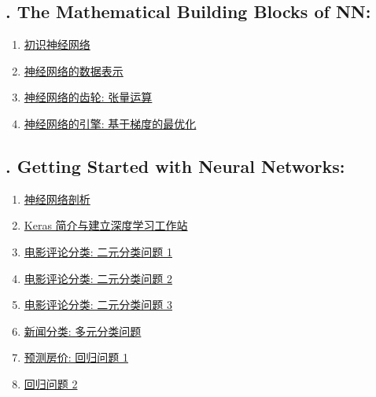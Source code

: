 \documentclass[11pt]{article}
\begin{document}
\subsection*{\small {}. The Mathematical Building Blocks of NN:}

\vspace{-0.5cm}

\begin{multicols}{2}
	\begin{enumerate}
		\item \href{https://mp.weixin.qq.com/s/ZKk_gu__FrkzHovbhUdDwQ}{初识神经网络}	%
		\item \href{https://mp.weixin.qq.com/s/u6eTUeILRhIsIuPVAVegsw}{神经网络的数据表示}	%
		\item \href{https://mp.weixin.qq.com/s/HOeED8Um1nz99EEnJ7I_JQ}{神经网络的齿轮: 张量运算}	%
		\item \href{https://mp.weixin.qq.com/s/9VCT-gYZ4rLtzUIWouqqGA}{神经网络的引擎: 基于梯度的最优化}	%
	\end{enumerate}
\end{multicols}

\subsection*{\small {}. Getting Started with Neural Networks:}

\vspace{-0.5cm}

\begin{multicols}{2}
	\begin{enumerate}
		\item \href{https://mp.weixin.qq.com/s/WlVnJmoQKPPKhLF7weLcrQ}{神经网络剖析}	%
		\item \href{https://mp.weixin.qq.com/s/qXRHlpKt_X68C95hBBq0vQ}{Keras 简介与建立深度学习工作站}	%
		\item \href{https://mp.weixin.qq.com/s/vc7O36XSuWspKnnnPQV1yg}{电影评论分类: 二元分类问题 1}	%
		\item \href{https://mp.weixin.qq.com/s/8ik7dHpse8Dz8FzWo99Amg}{电影评论分类: 二元分类问题 2}	%
		\item \href{https://mp.weixin.qq.com/s/P0GFe--7gmx6C-VE_K3rZA}{电影评论分类: 二元分类问题 3}	%
		\item \href{https://mp.weixin.qq.com/s/XV3R-Romc58CPQWsezlG_g}{新闻分类: 多元分类问题}	%
		\item \href{https://mp.weixin.qq.com/s/NKFtFaekWaD4sN15JDY52A}{预测房价: 回归问题 1}	%
		\item \href{https://mp.weixin.qq.com/s/8WtHxfCgwCtAgbFlXReJkA}{回归问题 2}	%
	\end{enumerate}
\end{multicols}
\end{document}

